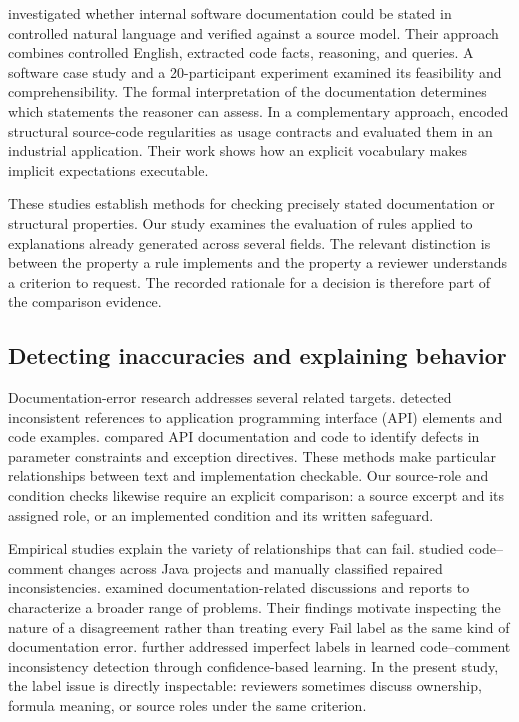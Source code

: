 \documentclass[a4paper,fleqn]{cas-dc}
\begin{document}
\citet{KuhnBergel2014} investigated whether internal software documentation could be stated in controlled natural language and verified against a source model. Their approach combines controlled English, extracted code facts, reasoning, and queries. A software case study and a 20-participant experiment examined its feasibility and comprehensibility. The formal interpretation of the documentation determines which statements the reasoner can assess. In a complementary approach, \citet{Lozano2015} encoded structural source-code regularities as usage contracts and evaluated them in an industrial application. Their work shows how an explicit vocabulary makes implicit expectations executable.

These studies establish methods for checking precisely stated documentation or structural properties. Our study examines the evaluation of rules applied to explanations already generated across several fields. The relevant distinction is between the property a rule implements and the property a reviewer understands a criterion to request. The recorded rationale for a decision is therefore part of the comparison evidence.

\subsection{Detecting inaccuracies and explaining behavior}
Documentation-error research addresses several related targets. \citet{ZhongSu2013} detected inconsistent references to application programming interface (API) elements and code examples. \citet{Zhou2017} compared API documentation and code to identify defects in parameter constraints and exception directives. These methods make particular relationships between text and implementation checkable. Our source-role and condition checks likewise require an explicit comparison: a source excerpt and its assigned role, or an implemented condition and its written safeguard.

Empirical studies explain the variety of relationships that can fail. \citet{Wen2019} studied code--comment changes across Java projects and manually classified repaired inconsistencies. \citet{Aghajani2019} examined documentation-related discussions and reports to characterize a broader range of problems. Their findings motivate inspecting the nature of a disagreement rather than treating every Fail label as the same kind of documentation error. \citet{Xu2024} further addressed imperfect labels in learned code--comment inconsistency detection through confidence-based learning. In the present study, the label issue is directly inspectable: reviewers sometimes discuss ownership, formula meaning, or source roles under the same criterion.
\end{document}
